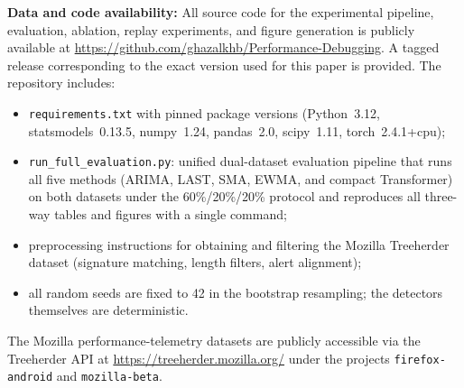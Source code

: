 \documentclass[a4paper,fleqn]{cas-sc}
\theoremstyle{plain}
\begin{document}
\noindent\textbf{Data and code availability:}
All source code for the experimental pipeline, evaluation, ablation, replay
experiments, and figure generation is publicly available at
\url{https://github.com/ghazalkhb/Performance-Debugging}.
A tagged release corresponding to the exact version used for this paper is
provided.
The repository includes:
\begin{itemize}
  \item \texttt{requirements.txt} with pinned package versions
    (Python~3.12, statsmodels~0.13.5, numpy~1.24, pandas~2.0, scipy~1.11,
     torch~2.4.1+cpu);
  \item \texttt{run\_full\_evaluation.py}: unified dual-dataset evaluation
    pipeline that runs all five methods (ARIMA, LAST, SMA, EWMA, and
    compact Transformer) on both datasets under the 60\%/20\%/20\% protocol
    and reproduces all three-way tables and figures with a single command;
  \item preprocessing instructions for obtaining and filtering the Mozilla
    Treeherder dataset (signature matching, length filters, alert alignment);
  \item all random seeds are fixed to 42 in the bootstrap resampling;
    the detectors themselves are deterministic.
\end{itemize}
The Mozilla performance-telemetry datasets are publicly accessible via the
Treeherder API at \url{https://treeherder.mozilla.org/} under the projects
\texttt{firefox-android} and \texttt{mozilla-beta}.


\end{document}
